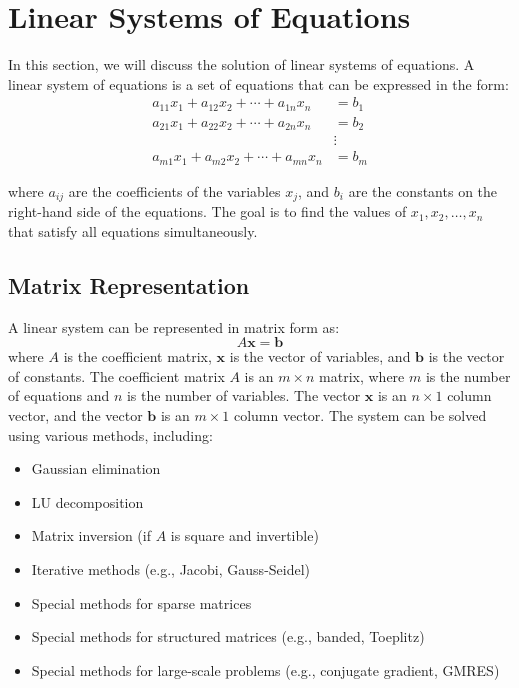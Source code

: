 \section{Linear Systems of Equations}

In this section, we will discuss the solution of linear systems of equations. A linear system of equations is a set of equations that can be expressed in the form:
\begin{align*}
a_{11}x_1 + a_{12}x_2 + \cdots + a_{1n}x_n & = b_1  \\
a_{21}x_1 + a_{22}x_2 + \cdots + a_{2n}x_n & = b_2  \\
& \vdots \\
a_{m1}x_1 + a_{m2}x_2 + \cdots + a_{mn}x_n & = b_m
\end{align*}

where \( a_{ij} \) are the coefficients of the variables \( x_j \), and \( b_i \) are the constants on the right-hand side of the equations. The goal is to find the values of \( x_1, x_2, \ldots, x_n \) that satisfy all equations simultaneously.

\subsection{Matrix Representation}

A linear system can be represented in matrix form as:
\begin{equation*}
	A \mathbf{x} = \mathbf{b}
\end{equation*}
where \( A \) is the coefficient matrix, \( \mathbf{x} \) is the vector of variables, and \( \mathbf{b} \) is the vector of constants. The coefficient matrix \( A \) is an \( m \times n \) matrix, where \( m \) is the number of equations and \( n \) is the number of variables.
The vector \( \mathbf{x} \) is an \( n \times 1 \) column vector, and the vector \( \mathbf{b} \) is an \( m \times 1 \) column vector. The system can be solved using various methods, including:

\begin{itemize}[label=\(-\)]
	\item Gaussian elimination
	\item LU decomposition
	\item Matrix inversion (if \( A \) is square and invertible)
	\item Iterative methods (e.g., Jacobi, Gauss-Seidel)
	\item Special methods for sparse matrices
	\item Special methods for structured matrices (e.g., banded, Toeplitz)
	\item Special methods for large-scale problems (e.g., conjugate gradient, GMRES)
\end{itemize}

